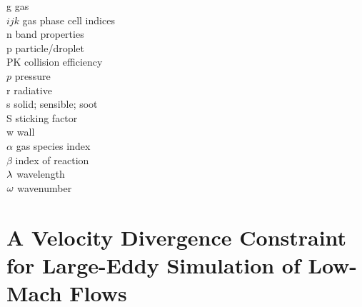 \begin{tabbing}
g                         \> gas \\
$ijk$                     \> gas phase cell indices \\
n                         \> band properties \\
p                         \> particle/droplet \\
PK                        \> collision efficiency \\
$p$                       \> pressure \\
r                         \> radiative \\
s                         \> solid; sensible; soot\\
S                         \> sticking factor \\
w                         \> wall \\
$\alpha$                  \> gas species index \\
$\beta$                   \> index of reaction \\
$\lambda$                     \> wavelength \\
$\omega$                     \> wavenumber \\
\end{tabbing}





\chapter{A Velocity Divergence Constraint for Large-Eddy Simulation of Low-Mach Flows}
\label{app_divergence}


